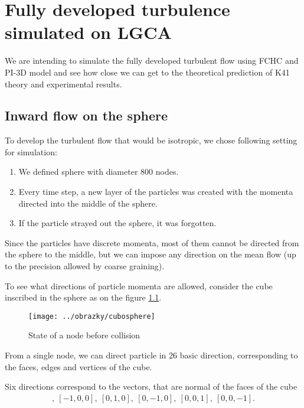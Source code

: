 \chapter{Fully developed turbulence simulated on LGCA}

We are intending to simulate the fully developed turbulent flow using FCHC and PI-3D model and see how close we can get to the theoretical prediction of K41 theory and experimental results.

\section{Inward flow on the sphere}
%
%


To develop the turbulent flow that would be isotropic, we chose following setting for simulation:
\begin{enumerate}
\item We defined sphere with diameter 800 nodes.
\item Every time step, a new layer of the particles was created with the momenta directed into the middle of the sphere.
\item If the particle strayed out the sphere, it was forgotten. 
\end{enumerate}

Since the particles have discrete momenta, most of them cannot be directed from the sphere to the middle, but we can impose any direction on the mean flow (up to the precision allowed by coarse graining).

To see what directions of particle momenta are allowed, consider the cube inscribed in the sphere as on the figure \ref{cubosphere}.
\begin{figure}[htbp] 
 \centering 
 \texttt{[image: ../obrazky/cubosphere]}
 \label{cubosphere}
 \caption{State of a node before collision}
\end{figure}
 
From a single node, we can direct particle in 26 basic direction, corresponding to the faces, edges and vertices of the cube.  

Six directions correspond to the vectors, that are normal of the faces of the cube
\begin{align}
[1,0,0],~[-1,0,0],~[0,1,0],~[0,-1,0],~[0,0,1],~[0,0,-1].
\end{align}

